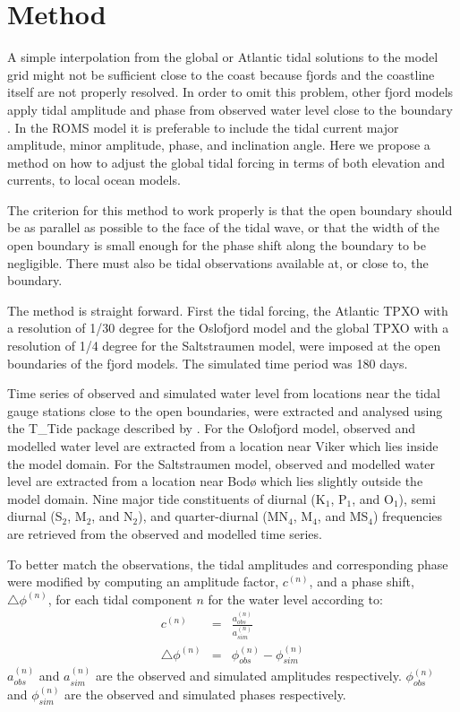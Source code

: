 \section{Method}

A simple interpolation from the global or Atlantic tidal solutions to the model grid might not be sufficient close to the coast because fjords and the coastline itself are not properly resolved. In order to omit this problem, other fjord models apply tidal amplitude and phase from observed water level close to the boundary \cite[i.e.]{foreman90,svendsen96,lynge13}. In the ROMS model it is preferable to include the tidal current major amplitude, minor amplitude, phase, and inclination angle. Here we propose a method on how to adjust the global tidal forcing in terms of both elevation and currents, to local ocean models. 

The criterion for this method to work properly is that the open boundary should be as parallel as possible to the face of the tidal wave, or that the width of the open boundary is small enough for the phase shift along the boundary to be negligible. There must also be tidal observations available at, or close to, the boundary.

The method is straight forward. First the tidal forcing, the Atlantic TPXO with a resolution of 1/30 degree for the Oslofjord model and the global TPXO with a resolution of 1/4 degree for the Saltstraumen model, were imposed at the open boundaries of the fjord models. The simulated time period was 180 days. 

Time series of observed and simulated water level from locations near the tidal gauge stations close to the open boundaries, were extracted and analysed using the T\_Tide package described by \cite{pawlowicz02}. For the Oslofjord model, observed and modelled water level are extracted from a location near Viker which lies inside the model domain. For the Saltstraumen model, observed and modelled water level are extracted from a location near Bod{\o} which lies slightly outside the model domain. Nine major tide constituents of diurnal (K$_1$, P$_1$, and O$_1$), semi diurnal (S$_2$, M$_2$, and N$_2$), and quarter-diurnal (MN$_4$, M$_4$, and MS$_4$) frequencies are retrieved from the observed and modelled time series. 

To better match the observations, the tidal amplitudes and corresponding phase were modified by computing an amplitude factor, $c^{(n)}$, and a phase shift, $\triangle \phi^{(n)}$, for each tidal component $n$ for the water level according to:
\begin{eqnarray}
c^{(n)} &=& \frac{a^{(n)}_{obs}}{a^{(n)}_{sim}} \\
\triangle \phi^{(n)} &=& \phi^{(n)}_{obs} - \phi^{(n)}_{sim}
\end{eqnarray}
$a^{(n)}_{obs}$ and $a^{(n)}_{sim}$ are the observed and simulated amplitudes respectively. $\phi^{(n)}_{obs}$ and $\phi^{(n)}_{sim}$ are the observed and simulated phases respectively. 

